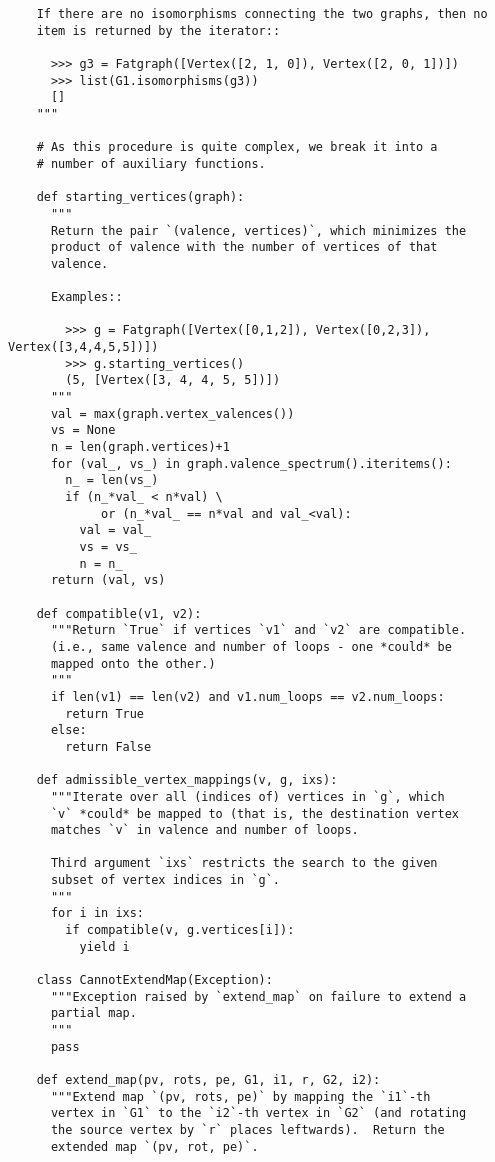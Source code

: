 \begin{lstlisting}
    If there are no isomorphisms connecting the two graphs, then no
    item is returned by the iterator::

      >>> g3 = Fatgraph([Vertex([2, 1, 0]), Vertex([2, 0, 1])])
      >>> list(G1.isomorphisms(g3))
      []
    """
    
    # As this procedure is quite complex, we break it into a
    # number of auxiliary functions.
    
    def starting_vertices(graph):
      """
      Return the pair `(valence, vertices)`, which minimizes the
      product of valence with the number of vertices of that
      valence.

      Examples::

        >>> g = Fatgraph([Vertex([0,1,2]), Vertex([0,2,3]), Vertex([3,4,4,5,5])])
        >>> g.starting_vertices()
        (5, [Vertex([3, 4, 4, 5, 5])])
      """
      val = max(graph.vertex_valences())
      vs = None
      n = len(graph.vertices)+1
      for (val_, vs_) in graph.valence_spectrum().iteritems():
        n_ = len(vs_)
        if (n_*val_ < n*val) \
             or (n_*val_ == n*val and val_<val):
          val = val_
          vs = vs_
          n = n_
      return (val, vs)

    def compatible(v1, v2):
      """Return `True` if vertices `v1` and `v2` are compatible.
      (i.e., same valence and number of loops - one *could* be
      mapped onto the other.)
      """
      if len(v1) == len(v2) and v1.num_loops == v2.num_loops:
        return True
      else:
        return False
        
    def admissible_vertex_mappings(v, g, ixs):
      """Iterate over all (indices of) vertices in `g`, which
      `v` *could* be mapped to (that is, the destination vertex
      matches `v` in valence and number of loops.

      Third argument `ixs` restricts the search to the given
      subset of vertex indices in `g`.
      """
      for i in ixs:
        if compatible(v, g.vertices[i]):
          yield i

    class CannotExtendMap(Exception):
      """Exception raised by `extend_map` on failure to extend a
      partial map.
      """
      pass

    def extend_map(pv, rots, pe, G1, i1, r, G2, i2):
      """Extend map `(pv, rots, pe)` by mapping the `i1`-th
      vertex in `G1` to the `i2`-th vertex in `G2` (and rotating
      the source vertex by `r` places leftwards).  Return the
      extended map `(pv, rot, pe)`.


\end{lstlisting}
